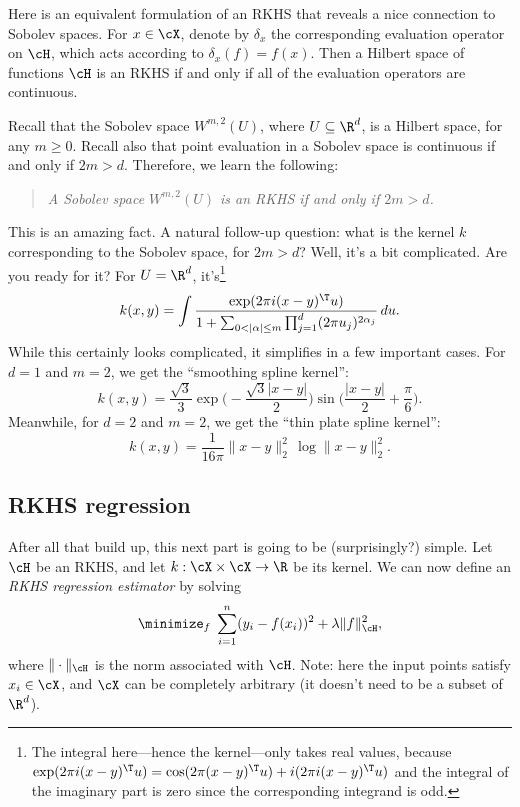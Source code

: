 \documentclass{article}
\begin{document}
Here is an equivalent formulation of an RKHS that reveals a nice connection to
Sobolev spaces. For $x \in \cX$, denote by $\delta_x$ the corresponding
evaluation operator on $\cH$, which acts according to $\delta_x(f) = f(x)$. Then
a Hilbert space of functions $\cH$ is an RKHS if and only if all of the
evaluation operators are continuous.  

Recall that the Sobolev space $W^{m,2}(U)$, where $U \subseteq \R^d$, is a
Hilbert space, for any $m \geq 0$. Recall also that point evaluation in a
Sobolev space is continuous if and only if $2m > d$. Therefore, we learn the
following:       
\begin{quote}
\centering\it
A Sobolev space $W^{m,2}(U)$ is an RKHS if and only if $2m > d$.
\end{quote}
This is an amazing fact. A natural follow-up question: what is the kernel $k$
corresponding to the Sobolev space, for $2m > d$? Well, it's a bit
complicated. Are you ready for it? For $U = \R^d$, it's\footnote{The integral 
  here---hence the kernel---only takes real values, because $\exp(2\pi i
  (x-y)^\T u) = \cos(2\pi(x-y)^\T u) + i (2\pi i (x-y)^\T u)$ and the integral
  of the imaginary part is zero since the corresponding integrand is odd.}  
\[
k(x,y) = \int \frac{\exp(2\pi i (x-y)^\T u)}{1 + \sum_{0 < |\alpha| \leq m}
  \prod_{j=1}^d (2\pi u_j)^{2\alpha_j}} \, du.
\]
While this certainly looks complicated, it simplifies in a few important cases.  
For $d=1$ and $m=2$, we get the ``smoothing spline kernel'': 
\begin{equation}
\label{eq:ss_rkhs}
k(x,y) = \frac{\sqrt{3}}{3} \exp\bigg( -\frac{\sqrt{3}|x-y|}{2} \bigg) 
\sin\bigg( \frac{|x-y|}{2} + \frac{\pi}{6} \bigg).
\end{equation}
Meanwhile, for $d=2$ and $m=2$, we get the ``thin plate spline kernel'': 
\begin{equation}
\label{eq:tp_rkhs}
k(x,y) = \frac{1}{16 \pi} \|x-y\|_2^2 \, \log \|x-y\|_2^2.
\end{equation}

\subsection{RKHS regression}

After all that build up, this next part is going to be (surprisingly?)
simple. Let $\cH$ be an RKHS, and let $k : \cX \times \cX \to \R$ be its
kernel. We can now define an \emph{RKHS regression estimator} by solving 
\begin{equation}
\label{eq:rkhs}
\minimize_f \; \sum_{i=1}^n (y_i - f(x_i))^2 + \lambda \|f\|_\cH^2,
\end{equation}
where $\|\cdot\|_\cH$ is the norm associated with $\cH$. Note: here the input
points satisfy $x_i \in \cX$, and $\cX$ can be completely arbitrary (it doesn't
need to be a subset of $\R^d$). 
\end{document}
